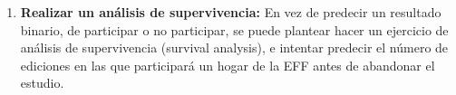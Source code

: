 \begin{enumerate}
\begin{enumerate}[noitemsep]
        \item \textbf{Realizar un análisis de supervivencia:} En vez de predecir un resultado binario, de participar o no participar, se puede plantear hacer un ejercicio de análisis de supervivencia (survival analysis), e intentar predecir el número de ediciones en las que participará un hogar de la EFF antes de abandonar el estudio.
    \end{enumerate}
\end{enumerate}